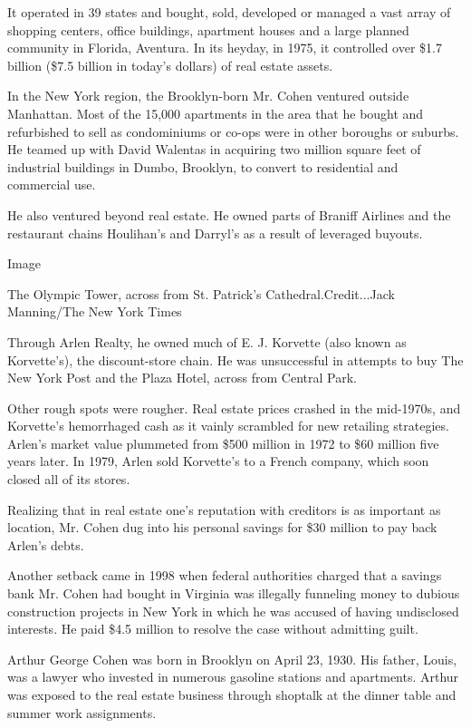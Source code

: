 It operated in 39 states and bought, sold, developed or managed a vast
array of shopping centers, office buildings, apartment houses and a
large planned community in Florida, Aventura. In its heyday, in 1975, it
controlled over \$1.7 billion (\$7.5 billion in today's dollars) of real
estate assets.

In the New York region, the Brooklyn-born Mr. Cohen ventured outside
Manhattan. Most of the 15,000 apartments in the area that he bought and
refurbished to sell as condominiums or co-ops were in other boroughs or
suburbs. He teamed up with David Walentas in acquiring two million
square feet of industrial buildings in Dumbo, Brooklyn, to convert to
residential and commercial use.

He also ventured beyond real estate. He owned parts of Braniff Airlines
and the restaurant chains Houlihan's and Darryl's as a result of
leveraged buyouts.

Image

The Olympic Tower, across from St. Patrick's Cathedral.Credit...Jack
Manning/The New York Times

Through Arlen Realty, he owned much of E. J. Korvette (also known as
Korvette's), the discount-store chain. He was unsuccessful in attempts
to buy The New York Post and the Plaza Hotel, across from Central Park.

Other rough spots were rougher. Real estate prices crashed in the
mid-1970s, and Korvette's hemorrhaged cash as it vainly scrambled for
new retailing strategies. Arlen's market value plummeted from \$500
million in 1972 to \$60 million five years later. In 1979, Arlen sold
Korvette's to a French company, which soon closed all of its stores.

Realizing that in real estate one's reputation with creditors is as
important as location, Mr. Cohen dug into his personal savings for \$30
million to pay back Arlen's debts.

Another setback came in 1998 when federal authorities charged that a
savings bank Mr. Cohen had bought in Virginia was illegally funneling
money to dubious construction projects in New York in which he was
accused of having undisclosed interests. He paid \$4.5 million to
resolve the case without admitting guilt.

Arthur George Cohen was born in Brooklyn on April 23, 1930. His father,
Louis, was a lawyer who invested in numerous gasoline stations and
apartments. Arthur was exposed to the real estate business through
shoptalk at the dinner table and summer work assignments.

